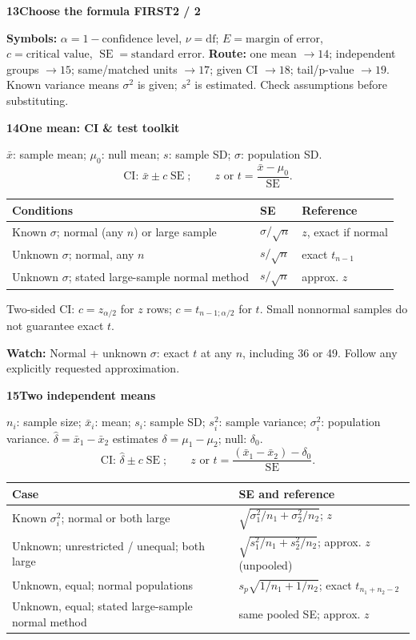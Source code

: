 \documentclass[a4paper,landscape]{article}
\newcommand{\head}[2][late]{\par\vspace{3pt}\noindent\colorbox{#1}{\parbox{\dimexpr\linewidth-6pt}{\color{white}\bfseries #2}}\par\vspace{1pt}}
\newcommand{\trap}[1]{\par{\color{alert}\textbf{Watch:} #1}}
\newcommand{\SE}{\operatorname{SE}}
\newcommand{\xb}{\bar x}
\newcommand{\tblhead}[1]{\textbf{#1}}
\begin{document}
\begin{multicols*}{4}
\head{13\quad Choose the formula FIRST\hfill 2 / 2}
\textbf{Symbols:} \(\alpha=1-\text{confidence level}\), \(\nu=\text{df}\); \(E=\text{margin of error}\), \(c=\text{critical value}\), \(\SE=\text{standard error}\).
\textbf{Route:} one mean \(\to14\); independent groups \(\to15\); same/matched units \(\to17\); given CI \(\to18\); tail/p-value \(\to19\). Known variance means \(\sigma^2\) is given; \(s^2\) is estimated. Check assumptions before substituting.
\head{14\quad One mean: CI \& test toolkit}
\(\xb\): sample mean; \(\mu_0\): null mean; \(s\): sample SD; \(\sigma\): population SD.
\[\text{CI: }\xb\pm c\SE;\qquad
 z\text{ or }t=\frac{\xb-\mu_0}{\SE}.\]
\begin{tabular}{@{}L{.44\linewidth}L{.22\linewidth}L{.25\linewidth}@{}}
\tblhead{Conditions} & \tblhead{SE} & \tblhead{Reference}\\\hline
Known \(\sigma\); normal (any \(n\)) or large sample & \(\sigma/\sqrt n\) & \(z\), exact if normal\\
Unknown \(\sigma\); normal, any \(n\) & \(s/\sqrt n\) & exact \(t_{n-1}\)\\
Unknown \(\sigma\); stated large-sample normal method & \(s/\sqrt n\) & approx. \(z\)
\end{tabular}
Two-sided CI: \(c=z_{\alpha/2}\) for \(z\) rows; \(c=t_{n-1;\alpha/2}\) for \(t\). Small nonnormal samples do not guarantee exact \(t\).
\trap{Normal + unknown \(\sigma\): exact \(t\) at any \(n\), including 36 or 49. Follow any explicitly requested approximation.}
\head{15\quad Two independent means}
\(n_i\): sample size; \(\xb_i\): mean; \(s_i\): sample SD; \(s_i^2\): sample variance; \(\sigma_i^2\): population variance. \(\hat\delta=\xb_1-\xb_2\) estimates \(\delta=\mu_1-\mu_2\); null: \(\delta_0\).
\[\text{CI: }\hat\delta\pm c\SE;\qquad
 z\text{ or }t=\frac{(\xb_1-\xb_2)-\delta_0}{\SE}.\]
\begin{tabular}{@{}L{.39\linewidth}L{.55\linewidth}@{}}
\tblhead{Case} & \tblhead{SE and reference}\\\hline
Known \(\sigma_i^2\); normal or both large & \(\sqrt{\sigma_1^2/n_1+\sigma_2^2/n_2}\); \(z\)\\
Unknown; unrestricted / unequal; both large & \(\sqrt{s_1^2/n_1+s_2^2/n_2}\); approx. \(z\) (unpooled)\\
Unknown, equal; normal populations & \(s_p\sqrt{1/n_1+1/n_2}\); exact \(t_{n_1+n_2-2}\)\\
Unknown, equal; stated large-sample normal method & same pooled SE; approx. \(z\)

\end{tabular}
\end{multicols*}
\end{document}
